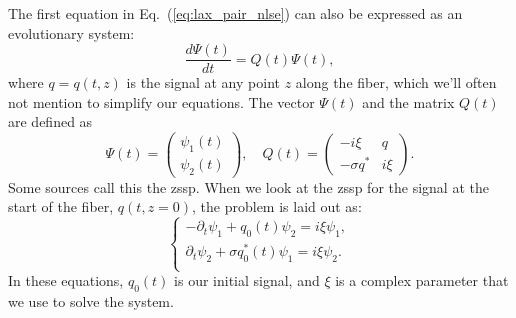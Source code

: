The first equation in Eq.~(\ref{eq:lax_pair_nlse}) can also be expressed as an evolutionary system:
\begin{equation}
    \frac{d \Psi(t)}{dt} = Q(t)\Psi(t),
    \label{eq:zsp_matrix}
\end{equation}
where \(q = q(t, z)\) is the signal at any point \(z\) along the fiber, which we'll often not mention to simplify our equations. The vector \(\Psi(t)\) and the matrix \(Q(t)\) are defined as
\[
    \Psi(t) = \begin{pmatrix} \psi_1(t) \\ \psi_2(t) \end{pmatrix}, \quad Q(t) = \begin{pmatrix} -i \xi & q \\ -\sigma q^* & i \xi \end{pmatrix}.
\]
Some sources call this the \Gls{zssp}. When we look at the \gls{zssp} for the signal at the start of the fiber, \(q(t,z=0)\), the problem is laid out as:
\begin{equation}
\left\{
\begin{aligned}
	- \partial_{t} \psi_1 + q_0(t) \psi_2 = i \xi \psi_1, \\
	\partial_{t} \psi_2 + \sigma q_0^{*}(t) \psi_1 = i \xi \psi_2. \\
\end{aligned}
\right.
\label{eq:ZS}
\end{equation}
In these equations, \(q_0(t)\) is our initial signal, and \(\xi\) is a complex parameter that we use to solve the system.




